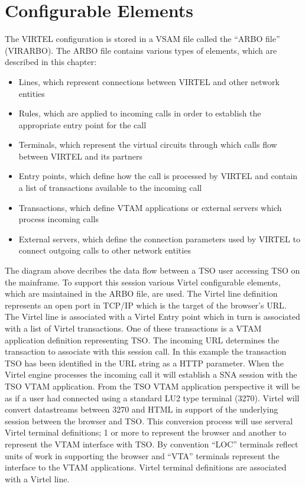\documentclass[letterpaper,10pt,english]{sphinxmanual}
\begin{document}
\section{Configurable Elements}
\label{\detokenize{connectivity_guide:configurable-elements}}
The VIRTEL configuration is stored in a VSAM file called the “ARBO file” (VIRARBO). The ARBO file contains various types of elements, which are described in this chapter:
\begin{itemize}
\item {} 
Lines, which represent connections between VIRTEL and other network entities

\item {} 
Rules, which are applied to incoming calls in order to establish the appropriate entry point for the call

\item {} 
Terminals, which represent the virtual circuits through which calls flow between VIRTEL and its partners

\item {} 
Entry points, which define how the call is processed by VIRTEL and contain a list of transactions available to the incoming call

\item {} 
Transactions, which define VTAM applications or external servers which process incoming calls

\item {} 
External servers, which define the connection parameters used by VIRTEL to connect outgoing calls to other network entities

\end{itemize}



The diagram above decribes the data flow between a TSO user accessing TSO on the mainframe. To support this session various Virtel configurable elements, which are maintained in the ARBO file, are used. The Virtel line definition represents an open port in TCP/IP which is the target of the browser’s URL. The Virtel line is associated with a Virtel Entry point which in turn is associated with a list of Virtel transactions. One of these transactions is a VTAM application definition representing TSO. The incoming URL determines the transaction to associate with this session call. In this example the transaction TSO has been identified in the URL string as a HTTP parameter. When the Virtel engine processes the incoming call it will establish a SNA session with the TSO VTAM application. From the TSO VTAM application perspective it will be as if a user had connected using a standard LU2 type terminal (3270). Virtel will convert datastreams between 3270 and HTML in support of the underlying session between the browser and TSO. This conversion process will use serveral Virtel terminal definitions; 1 or more to represent the browser and another to represent the VTAM interface with TSO. By convention “LOC” terminals reflect units of work in supporting the browser and “VTA” terminals represent the interface to the VTAM applications. Virtel terminal definitions are associated with a Virtel line.
\end{document}
